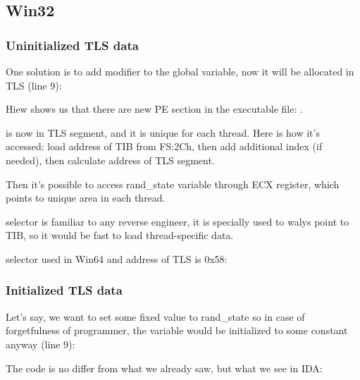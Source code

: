 \subsection{Win32}

\subsubsection{Uninitialized \ac{TLS} data}

One solution is to add  modifier to the global variable, now it will be allocated
in \ac{TLS} (line 9):



Hiew shows us that there are new PE section in the executable file: .



 is now in \ac{TLS} segment, and it is unique for each thread.
Here is how it's accessed: load address of \ac{TIB} from FS:2Ch, then add additional index (if needed),
then calculate address of \ac{TLS} segment.

Then it's possible to access rand\_state variable through ECX register, which points to unique area
in each thread.

 selector is familiar to any reverse engineer, it is specially used to walys point to \ac{TIB},
so it would be fast to load thread-specific data.

 selector used in Win64 and address of \ac{TLS} is 0x58:



\subsubsection{Initialized \ac{TLS} data}

Let's say, we want to set some fixed value to rand\_state so in case of forgetfulness of programmer,
the  variable would be initialized to some constant anyway (line 9):



The code is no differ from what we already saw, but what we see in IDA:



